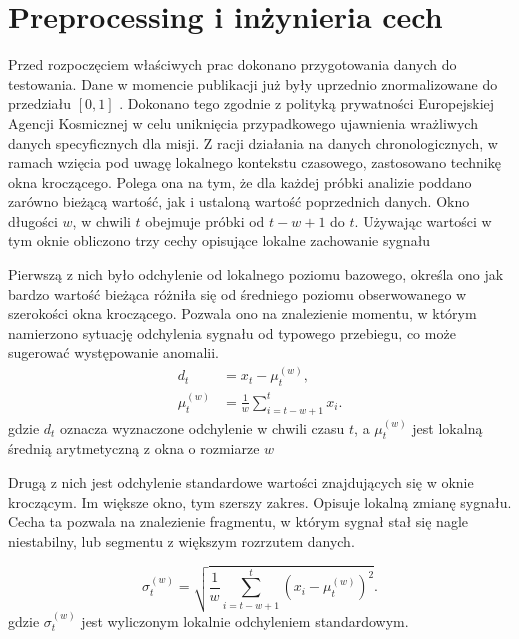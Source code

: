 \documentclass[a4paper,twoside,12pt]{book}
\begin{document}
	\section{Preprocessing i inżynieria cech}
	Przed rozpoczęciem właściwych prac dokonano przygotowania danych do testowania. Dane w momencie publikacji już były uprzednio znormalizowane do przedziału $[0, 1]$ \cite{kotowski2024esaadb}. Dokonano tego zgodnie z polityką prywatności Europejskiej Agencji Kosmicznej w celu uniknięcia przypadkowego ujawnienia wrażliwych danych specyficznych dla misji. Z racji działania na danych chronologicznych, w ramach wzięcia pod uwagę lokalnego kontekstu czasowego, zastosowano technikę okna kroczącego. Polega ona na tym, że dla każdej próbki analizie poddano zarówno bieżącą wartość, jak i ustaloną wartość poprzednich danych. Okno długości $w$, w chwili $t$ obejmuje próbki od $t - w +1$ do $t$.  Używając wartości w tym oknie obliczono trzy cechy opisujące lokalne zachowanie sygnału
	
	Pierwszą z nich było odchylenie od lokalnego poziomu bazowego, określa ono jak bardzo wartość bieżąca różniła się od średniego poziomu obserwowanego w szerokości okna kroczącego. Pozwala ono na znalezienie momentu, w którym namierzono sytuację odchylenia sygnału od typowego przebiegu, co może sugerować występowanie anomalii. 
	\begin{align}
		d_t &= x_t - \mu_t^{(w)}, \label{eq:dt} \\
		\mu_t^{(w)}   &= \frac{1}{w} \sum_{i=t-w+1}^{t} x_i. \label{eq:mu}
	\end{align}
	gdzie $d_t$ oznacza wyznaczone odchylenie w chwili czasu $t$, a $ \mu_t^{(w)}$ jest lokalną średnią arytmetyczną z okna o rozmiarze $w$
	
	Drugą z nich jest odchylenie standardowe wartości znajdujących się w oknie kroczącym. Im większe okno, tym szerszy zakres. Opisuje lokalną zmianę sygnału. Cecha ta pozwala na znalezienie fragmentu, w którym sygnał stał się nagle niestabilny, lub segmentu z większym rozrzutem danych.
	
	\begin{equation}
		\sigma_t^{(w)} =
		\sqrt{
			\frac{1}{w}
			\sum_{i=t-w+1}^{t}
			\left(x_i - \mu_t^{(w)}\right)^2
		}.
	\end{equation}
	gdzie $\sigma_t^{(w)}$ jest wyliczonym lokalnie odchyleniem standardowym.
	
\end{document}
